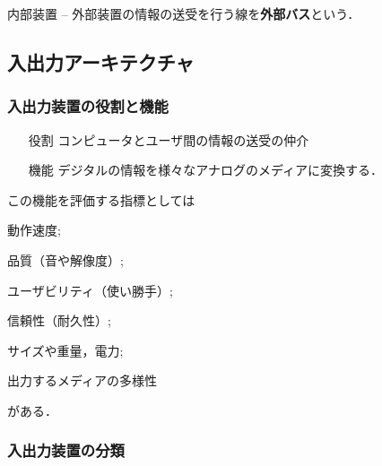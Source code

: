 内部装置 -- 外部装置の情報の送受を行う線を\textbf{外部バス}という．



\subsection{入出力アーキテクチャ}\label{sec:com_arch-3-B}
\subsubsection{入出力装置の役割と機能}\label{sec:com_arch-3-B-1}

\begin{enumerate}[labelsep=10pt, leftmargin=33pt]
	\item[役割] コンピュータとユーザ間の情報の送受の仲介
	\item[機能] デジタルの情報を様々なアナログのメディアに変換する．
\end{enumerate}

この機能を評価する指標としては
\begin{inparaenum}[(i)]
	\item 動作速度; 
	\item 品質（音や解像度）; 
	\item ユーザビリティ（使い勝手）;
	\item 信頼性（耐久性）;
	\item サイズや重量，電力;
	\item 出力するメディアの多様性
\end{inparaenum}
がある．



\subsubsection{入出力装置の分類}\label{sec:com_arch-3-B-2}

